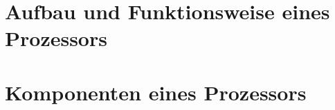 \documentclass[a4paper,12pt]{article}
\begin{document}
\centering
\section*{Aufbau und Funktionsweise eines Prozessors}
\bigskip
\section{Komponenten eines Prozessors}
\end{document}
